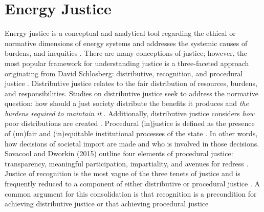 \section{Energy Justice}



Energy justice is a conceptual and analytical tool regarding the ethical or
normative dimensions of energy systems and addresses the systemic causes of
burdens, and inequities \cite{sovacool_energy_2015}.
    There are many conceptions of justice; however, the most popular framework
    for understanding justice is a three-faceted approach originating from David
    Schlosberg: distributive, recognition, and procedural justice
    \cite{schlosberg_2_2007}.
    Distributive justice relates to the fair distribution of resources,
    burdens, and responsibilities. Studies on distributive justice seek to
    address the normative question: how should a just society distribute the
    benefits it produces and \textit{the burdens required to maintain it}
    \cite{brighouse_justice_2004}. Additionally, distributive justice
    considers \textit{how} poor distributions are created
    \cite{schlosberg_2_2007}.
    Procedural (in)justice is defined as the presence of (un)fair and
    (in)equitable institutional processes of the state \cite{schlosberg_2_2007}.
    In other words, how decisions of societal import are made and who is
    involved in those decisions. Sovacool and Dworkin (2015) outline four
    elements of procedural justice: transparency, meaningful participation,
    impartiality, and avenues for redress \cite{sovacool_energy_2015}.    
Justice of recognition is the most vague of the three tenets of justice and is
    frequently reduced to a component of either distributive or procedural
    justice \cite{schlosberg_2_2007, van_uffelen_revisiting_2022}. A common
    argument for this consolidation is that recognition is a precondition for
    achieving distributive justice or that achieving procedural justice
